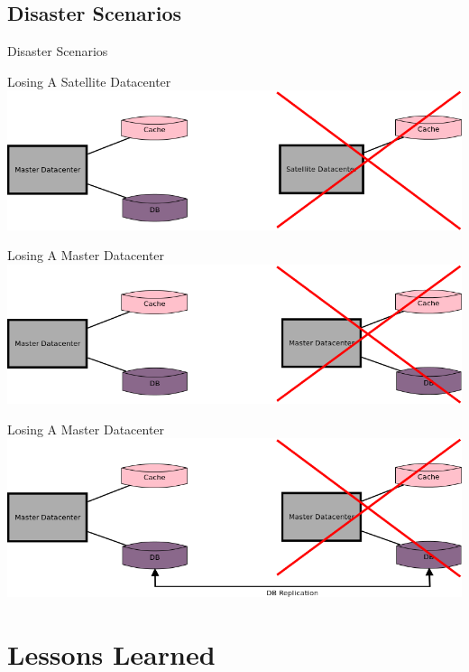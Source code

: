 \documentclass[aspectratio=169]{beamer}
\begin{document}
\subsection{Disaster Scenarios}

{
\begin{frame}{Disaster Scenarios}
\end{frame}
}

\begin{frame}{Losing A Satellite Datacenter}
    \includegraphics[width=\textwidth]{images/lostsatellitedc.png}
\end{frame}

\begin{frame}{Losing A Master Datacenter}
    \includegraphics[width=\textwidth]{images/lostmasterdc.png}
\end{frame}

\begin{frame}{Losing A Master Datacenter}
    \includegraphics[width=\textwidth]{images/lostmasterdchope.png}
\end{frame}

\section{Lessons Learned}
\end{document}
